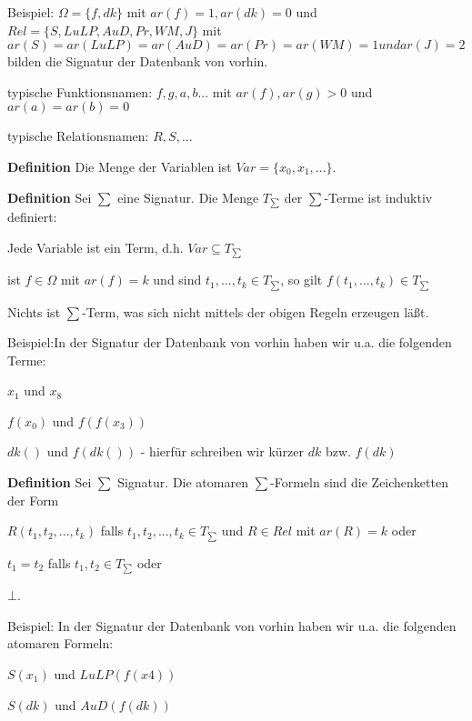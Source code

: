 \documentclass[a4paper]{article}
\renewcommand{\note}[2]{\begin{noteBox} \textbf{#1} #2 \end{noteBox}}
\begin{document}
\begin{multicols}{3}
  Beispiel: $\Omega=\{f,dk\}$ mit $ar(f) =1,ar(dk)=0$ und $Rel=\{S,LuLP,AuD,Pr,WM,J\}$ mit $ar(S) =ar(LuLP) =ar(AuD) =ar(Pr) =ar(WM) =1 undar(J) = 2$ bilden die Signatur der Datenbank von vorhin.
  \begin{itemize*}
    \item typische Funktionsnamen: $f, g, a, b...$ mit $ar(f),ar(g) > 0$ und $ar(a) =ar(b) = 0$
    \item typische Relationsnamen: $R,S,...$
  \end{itemize*}

  \note{Definition}{Die Menge der Variablen ist $Var=\{x_0,x_1 ,...\}$.}

  \note{Definition}{Sei $\sum$ eine Signatur. Die Menge $T_{\sum}$ der $\sum$-Terme ist induktiv definiert:
    \begin{enumerate*}
      \item Jede Variable ist ein Term, d.h. $Var\subseteq T_{\sum}$
      \item ist $f\in\Omega$ mit $ar(f)=k$ und sind $t_1,...,t_k\in T_{\sum}$, so gilt $f(t_1,...,t_k)\in T_{\sum}$
      \item Nichts ist $\sum$-Term, was sich nicht mittels der obigen Regeln erzeugen läßt.
    \end{enumerate*}
  }

  Beispiel:In der Signatur der Datenbank von vorhin haben wir u.a. die folgenden Terme:
  \begin{itemize*}
    \item $x_1$ und $x_8$
    \item $f(x_0)$ und $f(f(x_3))$
    \item $dk()$ und $f(dk())$ - hierfür schreiben wir kürzer $dk$ bzw. $f(dk)$
  \end{itemize*}

  \note{Definition}{Sei $\sum$ Signatur. Die atomaren $\sum$-Formeln sind die Zeichenketten der Form
    \begin{itemize*}
      \item $R(t_1,t_2,...,t_k)$ falls $t_1,t_2,...,t_k\in T_{\sum}$ und $R\in Rel$ mit $ar(R)=k$ oder
      \item $t_1=t_2$ falls $t_1,t_2\in T_{\sum}$ oder
      \item $\bot$.
    \end{itemize*}
  }

  Beispiel: In der Signatur der Datenbank von vorhin haben wir u.a. die folgenden atomaren Formeln:
  \begin{itemize*}
    \item $S(x_1)$ und $LuLP(f(x4))$
    \item $S(dk)$ und $AuD(f(dk))$
  \end{itemize*}


\end{multicols}
\end{document}
